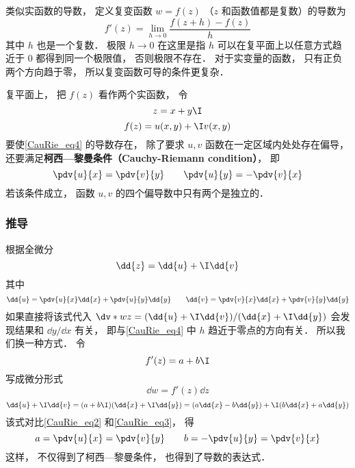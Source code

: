 
\begin{issues}
\issueDraft
\end{issues}


类似实函数的导数， 定义复变函数 $w = f(z)$ （$z$ 和函数值都是复数）的导数为
\begin{equation}\label{CauRie_eq4}
f'(z) = \lim_{h\to 0} \frac{f(z + h) - f(z)}{h}
\end{equation}
其中 $h$ 也是一个复数． 极限 $h \to 0$ 在这里是指 $h$ 可以在复平面上以任意方式趋近于 $0$ 都得到同一个极限值， 否则极限不存在． 对于实变量的函数， 只有正负两个方向趋于零， 所以复变函数可导的条件更复杂．

复平面上， 把 $f(z)$ 看作两个实函数， 令
\begin{equation}
z = x + y\I
\end{equation}
\begin{equation}
f(z) = u(x, y) + \I v(x, y)
\end{equation}
要使\autoref{CauRie_eq4} 的导数存在， 除了要求 $u, v$ 函数在一定区域内处处存在偏导， 还要满足\textbf{柯西—黎曼条件（Cauchy-Riemann condition）}， 即
\begin{equation}\label{CauRie_eq1}
\pdv{u}{x} = \pdv{v}{y} \qquad
\pdv{u}{y} = - \pdv{v}{x}
\end{equation}
若该条件成立， 函数 $u,v$ 的四个偏导数中只有两个是独立的．

\subsubsection{推导}
根据全微分
\begin{equation}\label{CauRie_eq2}
\dd{z} = \dd{u} + \I \dd{v}
\end{equation}
其中
\begin{equation}\label{CauRie_eq3}
\dd{u} = \pdv{u}{x} \dd{x} + \pdv{u}{y} \dd{y} \qquad
\dd{v} = \pdv{v}{x} \dd{x} + \pdv{v}{y} \dd{y}
\end{equation}
如果直接将该式代入 $\dv*{w}{z} = (\dd{u} + \I \dd{v})/(\dd{x} + \I \dd{y})$ 会发现结果和 $\dd{y}/\dd{x}$ 有关， 即与\autoref{CauRie_eq4} 中 $h$ 趋近于零点的方向有关． 所以我们换一种方式． 令
\begin{equation}
f'(z) = a + b\I
\end{equation}
写成微分形式
\begin{equation}
\dd{w} = f'(z)\dd{z}
\end{equation}
\begin{equation}
\dd{u} + \I \dd{v} = (a + b\I)(\dd{x} + \I\dd{y}) = (a \dd{x} - b\dd{y}) + \I (b \dd{x} + a\dd{y})
\end{equation}
该式对比\autoref{CauRie_eq2} 和\autoref{CauRie_eq3}， 得
\begin{equation}
a = \pdv{u}{x} = \pdv{v}{y} \qquad
b = -\pdv{u}{y} = \pdv{v}{x}
\end{equation}
这样， 不仅得到了柯西—黎曼条件， 也得到了导数的表达式．

